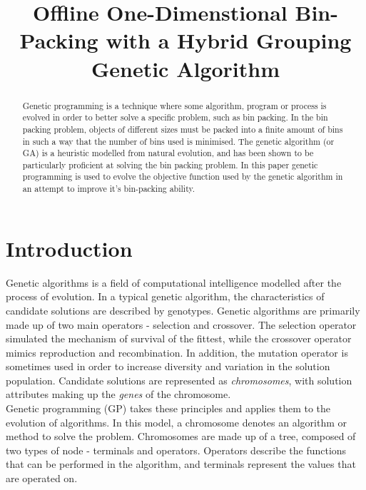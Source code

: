 \documentclass[conference]{IEEEtran}
\begin{document}
\title{Offline One-Dimenstional Bin-Packing with a Hybrid Grouping Genetic Algorithm}

\author{
}

\maketitle

\begin{abstract}
  Genetic programming is a technique where some algorithm, program or process is evolved in order to better solve a specific problem, such as bin packing. In the bin packing problem, objects of different sizes must be packed into a finite amount of bins in such a way that the number of bins used is minimised. The genetic algorithm (or GA) is a heuristic modelled from natural evolution, and has been shown to be particularly proficient at solving the bin packing problem. In this paper genetic programming is used to evolve the objective function used by the genetic algorithm in an attempt to improve it's bin-packing ability.
\end{abstract}

\IEEEpeerreviewmaketitle

\section{Introduction}
Genetic algorithms is a field of computational intelligence modelled after the process of evolution. In a typical genetic algorithm, the characteristics of candidate solutions are described by genotypes. Genetic algorithms are primarily made up of two main operators - selection and crossover. The selection operator simulated the mechanism of survival of the fittest, while the crossover operator mimics reproduction and recombination. In addition, the mutation operator is sometimes used in order to increase diversity and variation in the solution population. Candidate solutions are represented as \textit{chromosomes}, with solution attributes making up the \textit{genes} of the chromosome.\\

Genetic programming (GP) takes these principles and applies them to the evolution of algorithms. In this model, a chromosome denotes an algorithm or method to solve the problem. Chromosomes are made up of a tree, composed of two types of node - terminals and operators. Operators describe the functions that can be performed in the algorithm, and terminals represent the values that are operated on. \\
\end{document}
